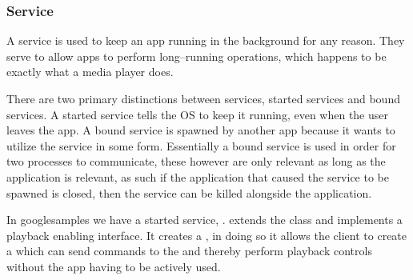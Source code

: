 \subsubsection{Service}\label{subsec:services}
A service is used to keep an app running in the background for any reason.
They serve to allow apps to perform long--running operations, which happens to be exactly what a media player does.

There are two primary distinctions between services, started services and bound services.
A started service tells the OS to keep it running, even when the user leaves the app.
A bound service is spawned by another app because it wants to utilize the service in some form.
Essentially a bound service is used in order for two processes to communicate, these however are only relevant as long as the application is relevant, as such if the application that caused the service to be spawned is closed, then the service can be killed alongside the application.\cite{androidFundamentals}

In googlesamples we have a started service, .
 extends the  class and implements a playback enabling interface.
It creates a , in doing so it allows the client to create a  which can send commands to the  and thereby perform playback controls without the app having to be actively used.
